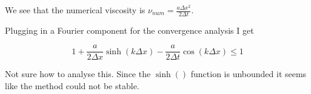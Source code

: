 \documentclass{article}
\begin{document}
We see that the numerical viscosity is $\nu_{num} = \frac{a\Delta x^2}{2\Delta t}$.

Plugging in a Fourier component for the convergence analysis I get

\begin{equation}
	1 + \frac{a}{2\Delta x} \sinh(k\Delta x) - \frac{a}{2\Delta t} \cos(k\Delta x) \leq 1
\end{equation}

Not sure how to analyse this. Since the $\sinh()$ function is unbounded it seems like the method could not be stable.

\newpage






\end{document}
